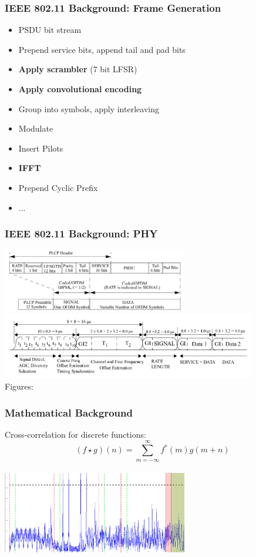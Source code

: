 \documentclass[accentcolor=tud8b,colorbacktitle]{tudbeamer}
\begin{document}
\begin{frame}
\frametitle{IEEE 802.11 Background: Frame Generation}
\begin{itemize}
	\item PSDU bit stream
	\item Prepend service bits, append tail and pad bits
	\item \textbf{Apply scrambler} (7 bit LFSR)
	\item \textbf{Apply convolutional encoding}
	\item Group into symbols, apply interleaving
	\item Modulate
	\item Insert Pilots
	\item \textbf{IFFT}
	\item Prepend Cyclic Prefix
	\item ...
\end{itemize}
\end{frame}


\begin{frame}
\frametitle{IEEE 802.11 Background: PHY}
\begin{center}
	\vspace{-0.3cm}
	\includegraphics[width=8.1cm]{assets/phy-format}\\
	\vspace{0.2cm}
	\includegraphics[width=11.1cm]{assets/preamble-format}\\
	\small Figures: \cite{ieee2012}
\end{center}
\end{frame}


\begin{frame}
\frametitle{Mathematical Background}
\begin{center}
Cross-correlation for discrete functions:
$$ (f \star g)(n) = \sum_{m=-\infty}^{\infty} f^{\ast}(m) g(m+n) $$\\
\vspace{0.5cm}
\includegraphics[width=8.1cm]{assets/title-image}
\end{center}
\end{frame}
\end{document}
